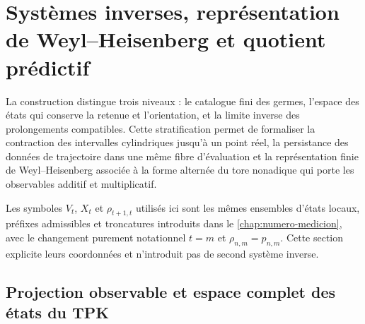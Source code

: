 \chapter{Systèmes inverses, représentation de Weyl--Heisenberg et quotient prédictif}
\label{chap:numero-heisenberg-d108}

La construction distingue trois niveaux : le catalogue fini des germes,
l'espace des états qui conserve la retenue et l'orientation, et la limite
inverse des prolongements compatibles. Cette stratification permet de
formaliser la contraction des intervalles cylindriques jusqu'à un point réel,
la persistance des données de trajectoire dans une même fibre d'évaluation et
la représentation finie de Weyl--Heisenberg associée à la forme alternée
du tore nonadique qui porte les observables additif et multiplicatif.

Les symboles \(V_t\), \(X_t\) et \(\rho_{t+1,t}\) utilisés ici sont les
mêmes ensembles d'états locaux, préfixes admissibles et troncatures
introduits dans le \cref{chap:numero-medicion}, avec le changement purement
notationnel \(t=m\) et \(\rho_{n,m}=p_{n,m}\). Cette section explicite leurs
coordonnées et n'introduit pas de second système inverse.

\section{Projection observable et espace complet des états du TPK}


